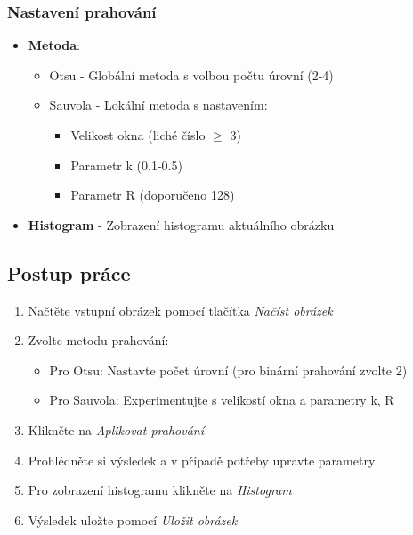 \documentclass[12pt,a4paper]{article}
\begin{document}
\subsubsection{Nastavení prahování}
\begin{itemize}
\item \textbf{Metoda}:
\begin{itemize}
\item Otsu - Globální metoda s volbou počtu úrovní (2-4)
\item Sauvola - Lokální metoda s nastavením:
  \begin{itemize}
  \item Velikost okna (liché číslo $\geq$ 3)
  \item Parametr k (0.1-0.5)
  \item Parametr R (doporučeno 128)
  \end{itemize}
\end{itemize}
\item \textbf{Histogram} - Zobrazení histogramu aktuálního obrázku
\end{itemize}

\subsection{Postup práce}
\begin{enumerate}
\item Načtěte vstupní obrázek pomocí tlačítka \textit{Načíst obrázek}
\item Zvolte metodu prahování:
\begin{itemize}
\item Pro Otsu: Nastavte počet úrovní (pro binární prahování zvolte 2)
\item Pro Sauvola: Experimentujte s velikostí okna a parametry k, R
\end{itemize}
\item Klikněte na \textit{Aplikovat prahování}
\item Prohlédněte si výsledek a v případě potřeby upravte parametry
\item Pro zobrazení histogramu klikněte na \textit{Histogram}
\item Výsledek uložte pomocí \textit{Uložit obrázek}
\end{enumerate}
\end{document}
